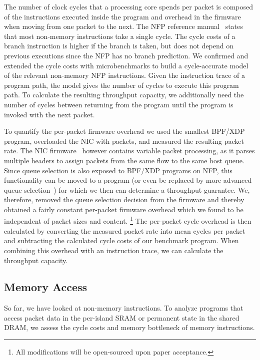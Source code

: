 \documentclass[10pt,letterpaper,sigconf,anonymous,nonacm,screen]{acmart}
\newcommand{\afblock}[1]{\noindent{\textbf{#1.}}}
\begin{document}
\afblock{Clock Cycles per Packet}
The number of clock cycles that a processing core spends per packet is composed of the instructions executed inside the program and overhead in the firmware when moving from one packet to the next.
The \ac{NFP} reference manual~\cite{reference-manual} states that most non-memory instructions take a single cycle.
The cycle costs of a branch instruction is higher if the branch is taken, but does not depend on previous executions since the \ac{NFP} has no branch prediction.
We confirmed and extended the cycle costs with microbenchmarks to build a cycle-accurate model of the relevant non-memory \ac{NFP} instructions.
Given the instruction trace of a program path, the model gives the number of cycles to execute this program path.
To calculate the resulting throughput capacity, we additionally need the number of cycles between returning from the program until the program is invoked with the next packet.

To quantify the per-packet firmware overhead we used the smallest BPF/XDP program, overloaded the NIC with packets, and measured the resulting packet rate.
The NIC firmware~\cite{nic-firmware} however contains variable packet processing, as it parses multiple headers to assign packets from the same flow to the same host queue.
Since queue selection is also exposed to BPF/XDP programs on NFP, this functionality can be moved to a program (or even be replaced by more advanced queue selection~\cite{smart-RSS}) for which we then can determine a throughput guarantee.
We, therefore, removed the queue selection decision from the firmware and thereby obtained a fairly constant per-packet firmware overhead which we found to be independent of packet sizes and content.
\footnote{All modifications will be open-sourced upon paper acceptance.} 
The per-packet cycle overhead is then calculated by converting the measured packet rate into mean cycles per packet and subtracting the calculated cycle costs of our benchmark program.
When combining this overhead with an instruction trace, we can calculate the throughput capacity.


\subsection{Memory Access}
\label{subsec:memory-access}

So far, we have looked at non-memory instructions.
To analyze programs that access packet data in the per-island SRAM or permanent state in the shared DRAM, we assess the cycle costs and memory bottleneck of memory instructions.
\end{document}
